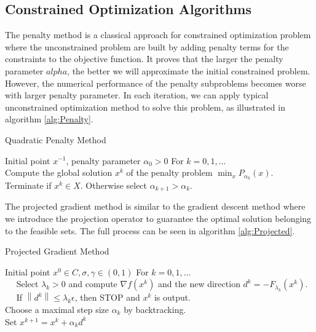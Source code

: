 \subsection{Constrained Optimization Algorithms}
The penalty method is a classical approach for constrained optimization problem where the unconstrained problem are built by adding penalty terms for the constraints to the objective function. It proves that the larger the penalty parameter $alpha$, the better we will approximate the initial constrained problem. However, the numerical performance of the penalty subproblems becomes worse with larger penalty parameter. In each iteration, we can apply typical unconstrained optimization method to solve this problem, as illustrated in algorithm \ref{alg:Penalty}.
\begin{algorithm}[H]
  \caption{Quadratic Penalty Method}
  \label{alg:Penalty}
  \begin{algorithmic}[1]
  \REQUIRE
  Initial point $x^{-1}$, penalty parameter $\alpha_{0}>0$
  \STATE For $k=0,1, \ldots$ \\
  \STATE Compute the global solution $x^{k}$ of the penalty problem $\min _{x} P_{\alpha_{k}}(x)$. \\     
  \ENSURE Terminate if $x^{k} \in X$. Otherwise select $\alpha_{k+1}>\alpha_{k}$.  
 \end{algorithmic}
 \end{algorithm} 

The projected gradient method is similar to the gradient descent method where we introduce the projection operator to guarantee the optimal solution belonging to the feasible sets. The full process can be seen in 
algorithm \ref{alg:Projected}.
 \begin{algorithm}[H]
  \caption{Projected Gradient Method}
  \label{alg:Projected}
  \begin{algorithmic}[1]
  \REQUIRE
  Initial point $x^{0} \in C, \sigma, \gamma \in(0,1)$
  \STATE For $k=0,1, \ldots$ \\
  \STATE $\quad$ Select $\lambda_{k}>0$ and compute $\nabla f\left(x^{k}\right)$ and the new direction $d^{k}=-F_{\lambda_{k}}\left(x^{k}\right)$.  \\
  \STATE $\quad$ If $\left\|d^{k}\right\| \leq \lambda_{k} \epsilon$, then STOP and $x^{k}$ is output.  \\
  \STATE Choose a maximal step size $\alpha_{k}$ by backtracking. \\    
  \STATE Set $x^{k+1}=x^{k}+\alpha_{k} d^{k}$
 \end{algorithmic}
 \end{algorithm} 



